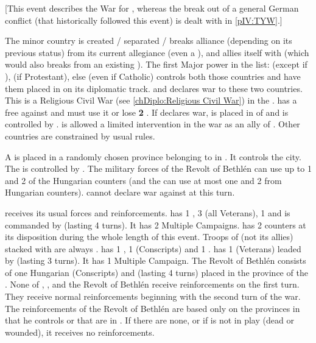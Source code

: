 \newpage\startevents




[This event describes the War for \paysBoheme, whereas the
break out of a general German conflict (that historically followed this event)
is dealt with in \ref{pIV:TYW}.]

\phevnt
{} The minor country \paysBoheme is created / separated
/ breaks alliance (depending on its previous status) from its current
allegiance (even a \GE), and allies itself with \paysPalatinat (which would
also breaks from an existing \GE). The first Major power in the list: \FRA
(except if \CATHCR), \POL (if Protestant), else \SUE (even if Catholic)
controls both those countries and have them placed in \EG on its diplomatic
track.
\aparag \paysBaviere and \hab declares war to these two countries. This is a
Religious Civil War (see \ref{chDiplo:Religious Civil War}) in the \HRE.
\bparag \AUS has a free \CB against \paysBoheme and must use it or lose {\bf
  2} \STAB.
\bparag If \HAB declares war, \paysBaviere is placed in \EG of \HAB and is
controlled by \MAJHAB.
\bparag \SPA is allowed a limited intervention in the war as an ally of
\HAB. Other countries are constrained by usual rules.

\bparag A \REVOLT \faceplus is placed in a randomly chosen province belonging
to \HAB in \paysHongrie. It controls the city. The \REVOLT is controlled by
\RUS.
\bparag The military forces of the Revolt of Bethlén can use up to 1 \ARMY and
2 \LD of the Hungarian counters (and the \HAB can use at most one \ARMY and 2
\LD from Hungarian counters).
\aparag \TUR cannot declare war against \HAB at this turn.

\phadm
\aparag \AUSMin receives its usual forces and reinforcements.
\aparag \paysBaviere has 1 \ARMY \faceplus, 3 \LD (all Veterans), 1 \fortress
and is commanded by  (lasting 4 turns).  It has 2
Multiple Campaigns. \paysBaviere has 2 \ARMY counters at its disposition
during the whole length of this event.
 Troops of \paysBaviere (not its allies)
stacked with \leaderTilly are always \TTER.
\aparag \paysBoheme has 1 \ARMY \faceplus, 1 \LD (Conscripts) and 1 \fortress.
\aparag \paysPalatinat has 1 \ARMY \faceplus (Veterans) leaded by
 (lasting 3 turns). It has 1 Multiple Campaign.
\aparag The Revolt of Bethlén consists of one Hungarian \ARMY \faceplus
(Conscripts) and  (lasting 4 turns) placed in the
province of the \REVOLT .
\aparag None of \paysBaviere, \paysBoheme, \paysPalatinat and the Revolt of
Bethlén receive reinforcements on the first turn. They receive normal
reinforcements beginning with the second turn of the war.
\aparag The reinforcements of the Revolt of Bethlén are based only on the
provinces in \payshongrie that he controls or that are in \REVOLT . If there
are none, or if \leaderBethlen is not in play (dead or wounded), it receives
no reinforcements.

